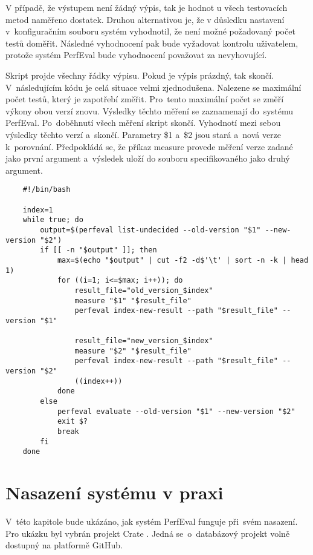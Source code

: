 V případě, že výstupem není žádný výpis, tak je hodnot u všech testovacích metod naměřeno dostatek. Druhou alternativou
je, že v důsledku nastavení v~konfiguračním souboru systém vyhodnotil, že není možné požadovaný
počet testů doměřit. Následné vyhodnocení pak bude vyžadovat kontrolu uživatelem, protože
systém PerfEval bude vyhodnocení považovat za nevyhovující.

Skript projde všechny řádky výpisu. Pokud je výpis prázdný, tak skončí.
V~následujícím kódu je celá situace velmi zjednodušena. Nalezene se maximální počet
testů, který je zapotřebí změřit. Pro~tento maximální počet se změří výkony obou verzí znovu. Výsledky těchto měření
se zaznamenají do~systému PerfEval. Po~doběhnutí všech měření skript skončí. Vyhodnotí mezi sebou výsledky těchto
verzí a~skončí. Parametry \$1 a~\$2 jsou stará a~nová verze k~porovnání. Předpokládá se, že
příkaz measure provede měření verze zadané jako první argument a~výsledek uloží do souboru specifikovaného jako druhý argument.

\begin{lstlisting}
    #!/bin/bash

    index=1
    while true; do
        output=$(perfeval list-undecided --old-version "$1" --new-version "$2")
        if [[ -n "$output" ]]; then
            max=$(echo "$output" | cut -f2 -d$'\t' | sort -n -k | head 1)
            for ((i=1; i<=$max; i++)); do
                result_file="old_version_$index"
                measure "$1" "$result_file"
                perfeval index-new-result --path "$result_file" --version "$1"

                result_file="new_version_$index"
                measure "$2" "$result_file"
                perfeval index-new-result --path "$result_file" --version "$2"
                ((index++))
            done
        else
            perfeval evaluate --old-version "$1" --new-version "$2"
            exit $?
            break
        fi
    done

\end{lstlisting}

\section{Nasazení systému v praxi}

V~této kapitole bude ukázáno, jak systém PerfEval funguje při~svém nasazení.
Pro ukázku byl vybrán projekt Crate \cite{crateDB}. Jedná se~o~databázový projekt
volně dostupný na platformě GitHub.

